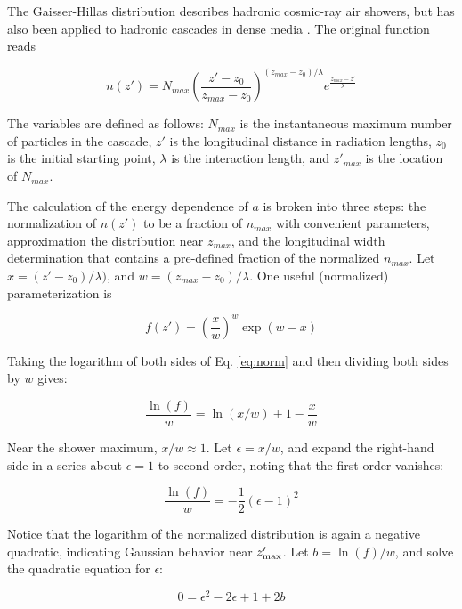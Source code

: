 \documentclass[amsmath,amssymb,aps,prd,10pt,twocolumn]{revtex4}
\begin{document}
The Gaisser-Hillas distribution describes hadronic cosmic-ray air showers, but has also been applied to hadronic cascades in dense media \cite{testbed}.  The original function reads

\begin{equation}
n(z') = N_{max} \left( \frac{z'-z_{0}}{z_{max} - z_{0}} \right)^{(z_{max} - z_{0})/\lambda} e^{ \frac{z_{max} - z'}{\lambda}}
\end{equation}

The variables are defined as follows: $N_{max}$ is the instantaneous maximum number of particles in the cascade, $z'$ is the longitudinal distance in radiation lengths, $z_0$ is the initial starting point, $\lambda$ is the interaction length, and $z'_{max}$ is the location of $N_{max}$.

The calculation of the energy dependence of $a$ is broken into three steps: the normalization of $n(z')$ to be a fraction of $n_{max}$ with convenient parameters, approximation the distribution near $z_{max}$, and the longitudinal width determination that contains a pre-defined fraction of the normalized $n_{max}$.  Let $x = (z'-z_0)/\lambda)$, and $w = (z_{max} - z_0)/\lambda$.  One useful (normalized) parameterization is

\begin{equation}
f(z') = \left( \frac{x}{w} \right)^{w} \exp(w-x) \label{eq:norm}
\end{equation}

Taking the logarithm of both sides of Eq. \ref{eq:norm} and then dividing both sides by $w$ gives:

\begin{equation}
\frac{\ln(f)}{w} = \ln(x/w) + 1 - \frac{x}{w}
\end{equation}

Near the shower maximum, $x/w \approx 1$.  Let $\epsilon = x/w$, and expand the right-hand side in a series about $\epsilon = 1$ to second order, noting that the first order vanishes:

\begin{equation}
\frac{\ln(f)}{w} = -\frac{1}{2}(\epsilon - 1)^2
\end{equation}

Notice that the logarithm of the normalized distribution is again a negative quadratic, indicating Gaussian behavior near $z'_{\rm max}$.  Let $b = \ln(f)/w$, and solve the quadratic equation for $\epsilon$:

\begin{equation}
0 = \epsilon^2 -2\epsilon + 1 + 2b
\end{equation}
\end{document}
